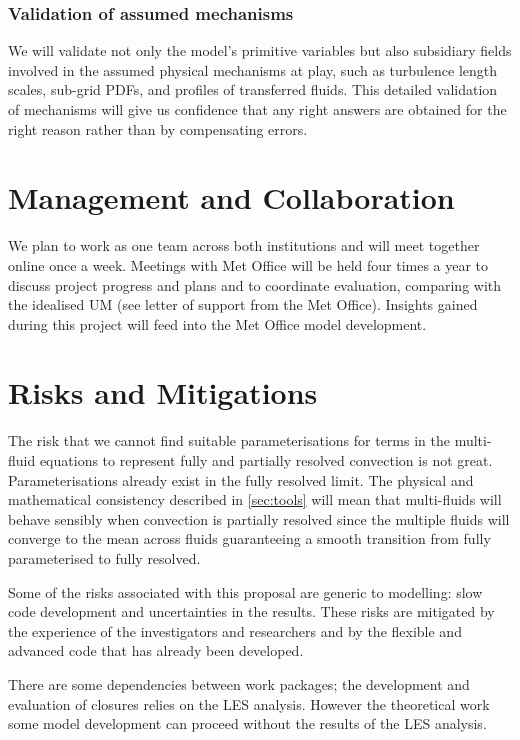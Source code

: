 \documentclass[11pt,a4paper]{article}
\begin{document}
\subsubsection*{Validation of assumed mechanisms}

We will validate not only the model's primitive variables but also subsidiary fields involved in the assumed physical mechanisms at play, such as turbulence length scales, sub-grid PDFs, and profiles of transferred fluids. This detailed validation of mechanisms will give us confidence that any right answers are obtained for the right reason rather than by compensating errors.

\section{Management and Collaboration}

We plan to work as one team across both institutions and will meet together online once a week. Meetings with Met Office will be held four times a year to discuss project progress and plans and to coordinate evaluation, comparing with the idealised UM (see letter of support from the Met Office). Insights gained during this project will feed into the Met Office model development.

\section{Risks and Mitigations}

The risk that we cannot find suitable parameterisations for terms in the multi-fluid equations to represent fully and partially resolved convection is not great. Parameterisations already exist in the fully resolved limit. The physical and mathematical consistency described in \ref{sec:tools} will mean that multi-fluids will behave sensibly when convection is partially resolved since the multiple fluids will converge to the mean across fluids guaranteeing a smooth transition from fully parameterised to fully resolved.

Some of the risks associated with this proposal are generic to modelling: slow code development and uncertainties in the results. These risks are mitigated by the experience of the investigators and researchers and by the flexible and advanced code that has already been developed.

There are some dependencies between work packages; the development and evaluation of closures relies on the LES analysis. However the theoretical work some model development can proceed without the results of the LES analysis.
\end{document}

